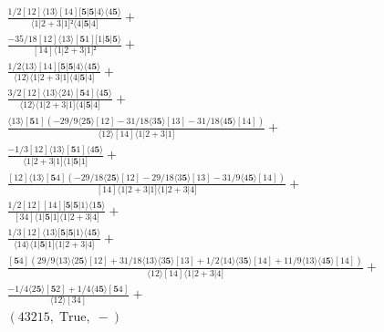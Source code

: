 \documentclass[varwidth, border=5pt]{standalone}
\begin{document}
\begin{my}
$\begin{gathered}
\scriptscriptstyle\frac{1/2[12]⟨13⟩[14][𝟓|𝟓|4⟩⟨4𝟓⟩}{⟨1|2+3|1]²⟨4|𝟓|4]} +\\
\scriptscriptstyle\frac{-35/18[12]⟨13⟩[𝟓1][1|𝟓|𝟓⟩}{[14]⟨1|2+3|1]²} +\\
\scriptscriptstyle\frac{1/2⟨13⟩[14][𝟓|𝟓|4⟩⟨4𝟓⟩}{⟨12⟩⟨1|2+3|1]⟨4|𝟓|4]} +\\
\scriptscriptstyle\frac{3/2[12]⟨13⟩⟨24⟩[𝟓4]⟨4𝟓⟩}{⟨12⟩⟨1|2+3|1]⟨4|𝟓|4]} +\\
\scriptscriptstyle\frac{⟨13⟩[𝟓1](-29/9⟨2𝟓⟩[12]-31/18⟨3𝟓⟩[13]-31/18⟨4𝟓⟩[14])}{⟨12⟩[14]⟨1|2+3|1]} +\\
\scriptscriptstyle\frac{-1/3[12]⟨13⟩[𝟓1]⟨4𝟓⟩}{⟨1|2+3|1]⟨1|𝟓|1]} +\\
\scriptscriptstyle\frac{[12]⟨13⟩[𝟓4](-29/18⟨2𝟓⟩[12]-29/18⟨3𝟓⟩[13]-31/9⟨4𝟓⟩[14])}{[14]⟨1|2+3|1]⟨1|2+3|4]} +\\
\scriptscriptstyle\frac{1/2[12][14][𝟓|𝟓|1⟩⟨1𝟓⟩}{[34]⟨1|𝟓|1]⟨1|2+3|4]} +\\
\scriptscriptstyle\frac{1/3[12]⟨13⟩[𝟓|𝟓|1⟩⟨4𝟓⟩}{⟨14⟩⟨1|𝟓|1]⟨1|2+3|4]} +\\
\scriptscriptstyle\frac{[𝟓4](29/9⟨13⟩⟨2𝟓⟩[12]+31/18⟨13⟩⟨3𝟓⟩[13]+1/2⟨14⟩⟨3𝟓⟩[14]+11/9⟨13⟩⟨4𝟓⟩[14])}{⟨12⟩[14]⟨1|2+3|4]} +\\
\scriptscriptstyle\frac{-1/4⟨2𝟓⟩[𝟓2]+1/4⟨4𝟓⟩[𝟓4]}{⟨12⟩[34]} +\\
\scriptscriptstyle(43215,\;\text{True},\;-) \phantom{+}
\end{gathered}$
\end{my}
\end{document}
